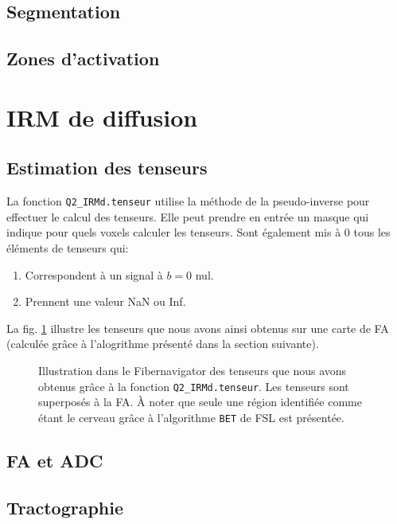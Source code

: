 \documentclass[a4paper]{article}
\begin{document}
\subsection{Segmentation}

\subsection{Zones d'activation}

\section{IRM de diffusion}

\subsection{Estimation des tenseurs}
La fonction \lstinline{Q2_IRMd.tenseur} utilise la méthode de la pseudo-inverse pour effectuer le calcul des tenseurs. Elle peut prendre en entrée un masque qui indique pour quels voxels calculer les tenseurs. Sont également mis à 0 tous les éléments de tenseurs qui:
\begin{enumerate}
\item Correspondent à un signal à $b=0$ nul.
\item Prennent une valeur NaN ou Inf. 
\end{enumerate}
La fig. \ref{tenseur_fiber} illustre les tenseurs que nous avons ainsi obtenus sur une carte de FA (calculée grâce à l'alogrithme présenté dans la section suivante).
\begin{figure}
\begin{center}
\caption{Illustration dans le Fibernavigator des tenseurs que nous avons obtenus grâce à la fonction \lstinline{Q2_IRMd.tenseur}. Les tenseurs sont superposés à la FA. À noter que seule une région identifiée comme étant le cerveau grâce à l'algorithme \lstinline{BET} de FSL est présentée. \label{tenseur_fiber}}
\end{center}
\end{figure}

\subsection{FA et ADC}

\subsection{Tractographie}
\end{document}
